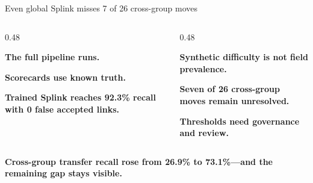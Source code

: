 \documentclass[aspectratio=169,12pt]{beamer}
\begin{document}
\begin{frame}{Even global Splink misses 7 of 26 cross-group moves}
  \begin{columns}[T,onlytextwidth]
    \begin{column}{0.48\textwidth}
      \par
      \vspace{0.12cm}
      {\fontsize{14}{19}\selectfont
      \textbf{The full pipeline runs.}\par\vspace{0.08cm}
      \textbf{Scorecards use known truth.}\par\vspace{0.08cm}
      \textbf{Trained Splink reaches 92.3\% recall with 0 false accepted links.}}
    \end{column}
    \begin{column}{0.48\textwidth}
      \par
      \vspace{0.12cm}
      {\fontsize{14}{19}\selectfont
      \textbf{Synthetic difficulty is not field prevalence.}\par\vspace{0.08cm}
      \textbf{Seven of 26 cross-group moves remain unresolved.}\par\vspace{0.08cm}
      \textbf{Thresholds need governance and review.}}
    \end{column}
  \end{columns}

  \vspace{0.10cm}
  \colorbox{EvidenceAmber!12}{\parbox{0.94\linewidth}{\centering\fontsize{13}{17}\selectfont\bfseries Cross-group transfer recall rose from 26.9\% to 73.1\%—and the remaining gap stays visible.}}
\end{frame}
\end{document}
